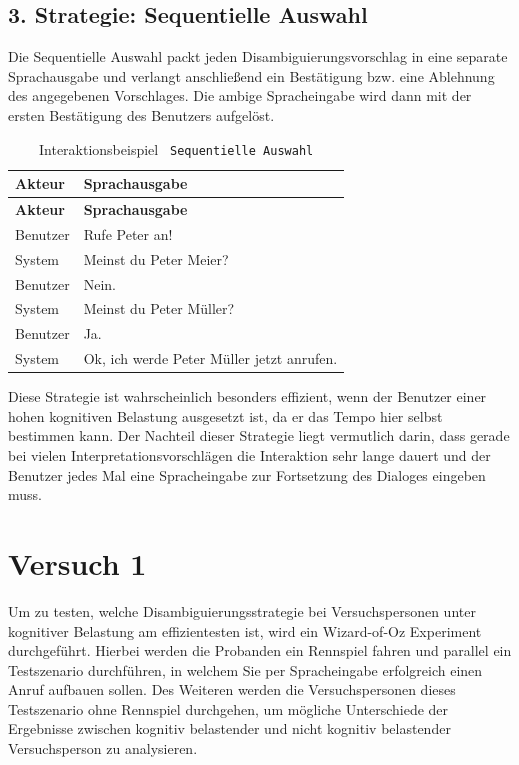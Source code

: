 \documentclass[12pt,a4paper]{scrartcl}
\begin{document}
\subsection{3. Strategie: Sequentielle Auswahl}
Die Sequentielle Auswahl packt jeden Disambiguierungsvorschlag in eine separate Sprachausgabe und verlangt anschließend ein Bestätigung bzw. eine Ablehnung des angegebenen Vorschlages. Die ambige Spracheingabe wird dann mit der ersten Bestätigung des Benutzers aufgelöst.

\begin{longtable}{p{6cm}p{8cm}}
	\caption[Interaktionsbeispiel \texttt{Sequentielle Auswahl}]{Interaktionsbeispiel \texttt{ Sequentielle Auswahl}}\\
	\hline
	\textbf{Akteur} &	\textbf{Sprachausgabe}\\
	\hline
	\endfirsthead
	\hline
	\textbf{Akteur} &	\textbf{Sprachausgabe}\\
	\hline
	\endhead
Benutzer & Rufe Peter an!\\
System & Meinst du Peter Meier?\\
Benutzer & Nein.\\
System & Meinst du Peter Müller?\\
Benutzer & Ja.\\
System & Ok, ich werde Peter Müller jetzt anrufen.\\

\hline
\end{longtable}

Diese Strategie ist wahrscheinlich besonders effizient, wenn der Benutzer einer hohen kognitiven Belastung ausgesetzt ist, da er das Tempo hier selbst bestimmen kann. Der Nachteil dieser Strategie liegt vermutlich darin, dass gerade bei vielen Interpretationsvorschlägen die Interaktion sehr lange dauert und der Benutzer jedes Mal eine Spracheingabe zur Fortsetzung des Dialoges eingeben muss. 

\section{Versuch 1}
\label{versuch1}
Um zu testen, welche Disambiguierungsstrategie bei Versuchspersonen unter kognitiver Belastung am effizientesten ist, wird ein Wizard-of-Oz Experiment durchgeführt. Hierbei werden die Probanden ein Rennspiel fahren und parallel ein Testszenario durchführen, in welchem Sie per Spracheingabe erfolgreich einen Anruf aufbauen sollen. Des Weiteren werden die Versuchspersonen dieses Testszenario ohne Rennspiel durchgehen, um mögliche Unterschiede der Ergebnisse zwischen kognitiv belastender und nicht kognitiv belastender Versuchsperson zu analysieren. 
\end{document}
